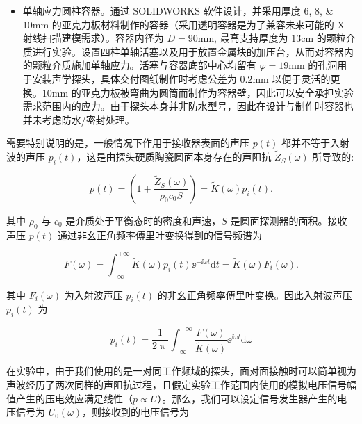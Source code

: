 \begin{itemize}
  \item 单轴应力圆柱容器。通过 SOLIDWORKS 软件设计，并采用厚度 \numlist{6;8;10}\unit{\milli\meter} 的亚克力板材料制作的容器（采用透明容器是为了兼容未来可能的 X 射线扫描建模需求）。容器内径为 $D = 90\unit{\milli\meter}$, 最高支持厚度为 $13\unit{\centi\meter}$ 的颗粒介质进行实验。设置四柱单轴活塞以及用于放置金属块的加压台，从而对容器内的颗粒介质施加单轴应力。活塞与容器底部中心均留有 $\varphi=19\unit{\milli\meter}$ 的孔洞用于安装声学探头，具体交付图纸制作时考虑公差为 $0.2\unit{\milli\meter}$ 以便于灵活的更换。$10\unit{\milli\meter}$ 的亚克力板被弯曲为圆筒而制作为容器壁，因此可以安全承担实验需求范围内的应力。由于探头本身并非防水型号，因此在设计与制作时容器也并未考虑防水/密封处理。
\end{itemize}




需要特别说明的是，一般情况下作用于接收器表面的声压 $p(t)$ 都并不等于入射波的声压 $p_{i}(t)$，这是由探头硬质陶瓷圆面本身存在的声阻抗 $\widetilde{Z}_{S}(\omega)$ 所导致的:

\begin{equation}
  p(t) = \left(1 + \frac{\widetilde{Z}_{S}(\omega)}{\rho_{0}c_{0}S}\right) =\widetilde{K}(\omega)p_{i}(t).
\end{equation}

其中 $\rho_{0}$ 与 $c_{0}$ 是介质处于平衡态时的密度和声速，$S$ 是圆面探测器的面积。接收声压 $p(t)$ 通过非幺正角频率傅里叶变换得到的信号频谱为

\begin{equation}
  F(\omega) = \int_{-\infty}^{+\infty}\widetilde{K}(\omega)p_{i}(t){\ee}^{-\ii\omega t}\mathrm{d}t = \widetilde{K}(\omega)F_{i}(\omega).
\end{equation}

其中 $F_{i}(\omega)$ 为入射波声压 $p_{i}(t)$ 的非幺正角频率傅里叶变换。因此入射波声压 $p_{i}(t)$ 为

\begin{equation}
  p_{i}(t) = \frac{1}{2\uppi}\int_{-\infty}^{+\infty}\frac{F(\omega)}{\widetilde{K}(\omega)}{\ee}^{\ii\omega t}\mathrm{d}\omega\label{eq:response_correct}
\end{equation}

在实验中，由于我们使用的是一对同工作频域的探头，面对面接触时可以简单视为声波经历了两次同样的声阻抗过程，且假定实验工作范围内使用的模拟电压信号幅值产生的压电效应满足线性（$p\propto U$）。那么，我们可以设定信号发生器产生的电压信号为 $U_{0}(\omega)$，则接收到的电压信号为


